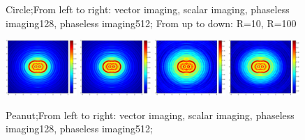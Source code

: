\documentclass[12pt]{iopart}
\begin{document}
\begin{figure}
	\caption{Circle;From left to right: vector imaging, scalar imaging, phaseless imaging128, phaseless imaging512; From up to down: R=10, R=100 }\label{figure_circle_phaless}
\end{figure}
\begin{figure}
	\centering
	\includegraphics[width=0.24\textwidth]{./graphic_phase/peanut_r_10_k_4_vector.eps}
	\includegraphics[width=0.24\textwidth]{./graphic_phase/peanut_r_10_k_4_scalar.eps}
	\includegraphics[width=0.24\textwidth]{./graphic_phase/peanut_r_10_k_4_phaseless_n_128_bias_100.eps}
	\includegraphics[width=0.24\textwidth]{./graphic_phase/peanut_r_10_k_4_phaseless_n_512_bias_100.eps}
	\caption{Peanut;From left to right: vector imaging, scalar imaging, phaseless imaging128, phaseless imaging512;  }\label{figure_peanut_phaless}
\end{figure}
\end{document}
